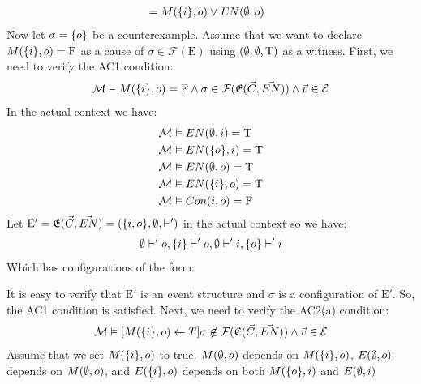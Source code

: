 \begin{example}
\begin{align*}
                        & = M(\{i\},o) \vee EN(\emptyset,o)               
    \end{align*}
    Now let $\sigma = \{o\}$ be a counterexample.
    Assume that we want to declare $M(\{i\},o) = \mathrm{F}$ as a cause of
    $\sigma \in \mathcal{F}(\mathrm{E})$ using $(\emptyset,\emptyset,\mathrm{T})$ as a witness.
    First, we need to verify the AC1 condition:
    \begin{align*}
        \mathcal{M} \vDash M(\{i\},o) = \mathrm{F} \wedge \sigma
        \in \mathcal{F}(\mathfrak{E}(\vec C,\vec {EN})) \wedge \vec v \in \mathcal{E}
    \end{align*}
    In the actual context we have:
    \begin{align*}
        \mathcal{M} & \vDash EN(\emptyset,i) = \mathrm{T}    \\
        \mathcal{M} & \vDash EN(\{o\},i) = \mathrm{T} \\
        \mathcal{M} & \vDash EN(\emptyset,o) = \mathrm{T}    \\
        \mathcal{M} & \vDash EN(\{i\},o) = \mathrm{T} \\
        \mathcal{M} & \vDash Con(i,o) = \mathrm{F}    
    \end{align*}
    Let $\mathrm{E'} = \mathfrak{E}(\vec C,\vec {EN}) = (\{i,o\},\emptyset,\vdash')$
    in the actual context so we have:
    \begin{align*}
        \emptyset \vdash' o, \{i\} \vdash' o, \emptyset \vdash' i,
        \{o\} \vdash' i
    \end{align*}
    Which has configurations of the form:
    \begin{center}
    \end{center}
    It is easy to verify that $\mathrm{E'}$ is an event structure and
    $\sigma$ is a configuration of $\mathrm{E'}$.  
    So, the AC1 condition is satisfied.
    Next, we need to verify the AC2(a) condition:
    \begin{align*}
        \mathcal{M} \vDash [M(\{i\},o) \leftarrow T] \sigma \not \in \mathcal{F}(\mathfrak{E}(\vec C,\vec {EN}))
        \wedge \vec v \in \mathcal{E}
    \end{align*}
    Assume that we set $M(\{i\},o)$ to true.
    $M(\emptyset,o)$ depends on $M(\{i\},o)$, $E(\emptyset,o)$ depends on $M(\emptyset,o)$, and
    $E(\{i\},o)$ depends on both $M(\{o\},i)$ and $E(\emptyset,i)$

\end{example}
